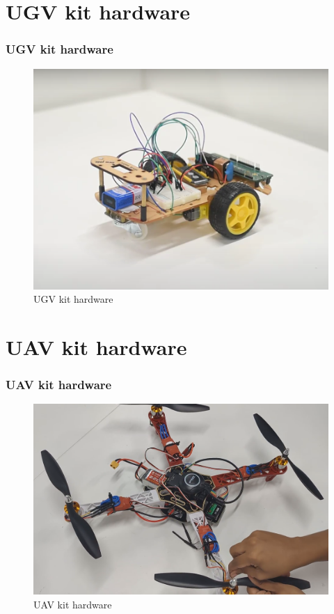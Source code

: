 \documentclass[xcolor=table]{beamer}
\begin{document}
\section{UGV kit hardware}
\begin{frame}
\frametitle{UGV kit hardware}
\begin{figure}[h!]
  \centering
  \includegraphics[width=0.8\linewidth]{./figs/UGV_components_1.png}
  \caption{UGV kit hardware}
  \label{UGV_kit_hardware}
\end{figure}
\end{frame}

\section{UAV kit hardware}
\begin{frame}
\frametitle{UAV kit hardware}
\begin{figure}[h!]
  \centering
  \includegraphics[width=0.9\linewidth]{./figs/UAV_components.png}
  \caption{UAV kit hardware}
  \label{fig:side3}
\end{figure}
\end{frame}
\end{document}
